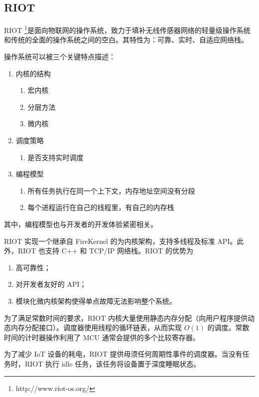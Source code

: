 \documentclass{ctexart}
\begin{document}
\subsection{RIOT}

RIOT \footnote{http://www.riot-os.org/}是面向物联网的操作系统，致力于填补无线传感器网络的轻量级操作系统和传统的全面的操作系统之间的空白。其特性为：可靠、实时、自适应网络栈。

操作系统可以被三个关键特点描述：

\begin{enumerate}
	\item 内核的结构
	\begin{enumerate}
		\item 宏内核
		\item 分层方法
		\item 微内核
	\end{enumerate}
	\item 调度策略
	\begin{enumerate}
		\item 是否支持实时调度
	\end{enumerate}
	\item 编程模型
	\begin{enumerate}
		\item 所有任务执行在同一个上下文，内存地址空间没有分段
		\item 每个进程运行在自己的线程里，有自己的内存栈
	\end{enumerate}
\end{enumerate}

其中，编程模型也与开发者的开发体验紧密相关。

RIOT 实现一个继承自 FireKernel 的为内核架构，支持多线程及标准 API。此外，RIOT 也支持 C++ 和 TCP/IP 网络栈。RIOT 的优势为

\begin{enumerate}
	\item 高可靠性；
	\item 对开发者友好的 API；
	\item 模块化微内核架构使得单点故障无法影响整个系统。
\end{enumerate}

为了满足常数时间的要求，RIOT 内核大量使用静态内存分配（向用户程序提供动态内存分配接口）。调度器使用线程的循环链表，从而实现 $O(1)$ 的调度。常数时间的计时器操作利用了 MCU 通常会提供的多个比较寄存器。

为了减少 IoT 设备的耗电，RIOT 提供毋须任何周期性事件的调度器。当没有任务时，RIOT 执行 idle 任务，该任务将设备置于深度睡眠状态。
\end{document}

